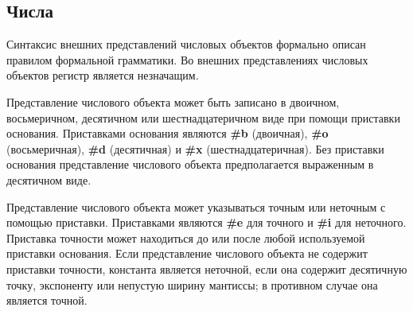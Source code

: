 \subsection{Числа}
\label{numbernotations}

Синтаксис внешних представлений числовых объектов формально описан правилом 
формальной грамматики. Во внешних представлениях числовых объектов регистр является незначащим.

Представление числового объекта может быть записано в двоичном, восьмеричном, десятичном или
шестнадцатеричном виде при помощи приставки основания. Приставками основания являются
{\bfseries\cf \#b} (двоичная), {\bfseries\cf \#o} (восьмеричная),
{\bfseries\cf \#d} (десятичная) и {\bfseries\cf \#x}
(шестнадцатеричная). Без приставки основания представление числового объекта предполагается
выраженным в десятичном виде.

Представление числового объекта может указываться точным или неточным с помощью
приставки. Приставками являются {\bfseries\cf \#e} для точного и {\bfseries\cf
  \#i} для неточного. Приставка точности может находиться до или после любой
используемой приставки основания. Если представление числового объекта не содержит приставки
точности, константа является неточной, если она содержит десятичную точку, экспоненту или
непустую ширину мантиссы; в противном случае она является точной.

